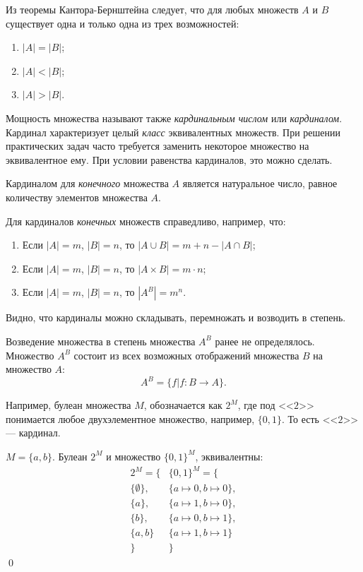 Из теоремы Кантора-Бернштейна следует, что для любых множеств $A$ и $B$ существует одна и только одна из трех возможностей:
\begin{enumerate}
    \item $|A|=|B|$;
    \item $|A|<|B|$;
    \item $|A|>|B|$.
\end{enumerate}

Мощность множества называют также \emph{кардинальным числом} или \emph{кардиналом}.  Кардинал характеризует целый \emph{класс} эквивалентных множеств. При решении практических задач часто требуется заменить некоторое множество на эквивалентное ему. При условии равенства кардиналов, это можно сделать.

Кардиналом для \emph{конечного} множества $A$ является натуральное число, равное количеству элементов множества $A$.

Для кардиналов \emph{конечных} множеств справедливо, например, что:
\begin{enumerate}
    \item Если $|A|=m$, $|B|=n$, то $|A\cup B|=m+n-|A\cap B|$;
    \item Если $|A|=m$, $|B|=n$, то $|A\times B|=m\cdot n$;
    \item Если $|A|=m$, $|B|=n$, то $|A^B|=m^n$.
\end{enumerate}

Видно, что кардиналы можно складывать, перемножать и возводить в степень.

Возведение множества в степень множества $A^B$ ранее не определялось. Множество $A^B$ состоит из всех возможных отображений множества $B$ на множество $A$:
\[
    A^B=\{f|f:B\to A\}.
\]

Например, булеан множества $M$, обозначается как $2^M$, где под <<$2$>> понимается любое двухэлементное множество, например, $\{0,1\}$. То есть <<$2$>> --- кардинал.
\begin{exampl} $M=\{a,b\}$. Булеан $2^M$ и множество $\{0,1\}^M$, эквивалентны:
    \[
    \begin{array}{c|c}
        2^M = \{          & \{0,1\}^M=\{                \\ \hline
        \{\emptyset\},    & \{a\mapsto 0, b\mapsto 0\}, \\
        \{a\},            & \{a\mapsto 1, b\mapsto 0\}, \\
        \{b\},            & \{a\mapsto 0, b\mapsto 1\}, \\
        \{a,b\}           & \{a\mapsto 1, b\mapsto 1\}  \\ \hline
        \}                &\}
    \end{array}
    \]
    \qed
\end{exampl}

